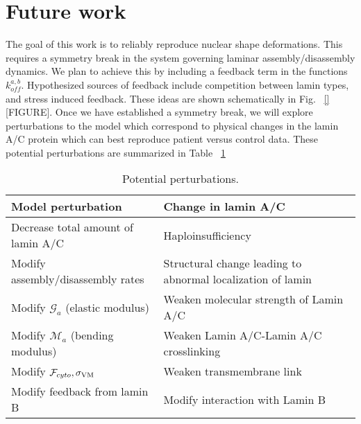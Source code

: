 \section{Future work} \label{sec:futurework}

The goal of this work is to reliably reproduce nuclear shape deformations. This requires a symmetry break in the system governing laminar assembly/disassembly dynamics. We plan to achieve this by including a feedback term in the functions $k_{off}^{a,b}$. Hypothesized sources of feedback include competition between lamin types, and stress induced feedback. These ideas are shown schematically in Fig. ~\ref{} [FIGURE]. Once we have established a symmetry break, we will explore perturbations to the model which correspond to physical changes  in the lamin A/C protein which can best reproduce patient versus control data. These potential perturbations are summarized in Table ~\ref{tab:perturbations}

\begin{table}[t!]
\caption{Potential perturbations.}\centering \label{tab:perturbations} 
\begin{tabular}{ l  l}
\hline
Model perturbation & Change in lamin A/C \\
\hline
Decrease total amount of lamin A/C  & Haploinsufficiency  \\
Modify assembly/disassembly rates & Structural change leading to abnormal localization of lamin\\
Modify $\mathcal{G}_a$ (elastic modulus) & Weaken molecular strength of Lamin A/C  \\
Modify $\mathcal{M}_a$ (bending modulus)& Weaken Lamin A/C-Lamin A/C crosslinking  \\
Modify $\mathcal{F}_{cyto}, \sigma_{\rm VM}$ & Weaken transmembrane link  \\
Modify feedback from lamin B &Modify interaction with Lamin B \\
\hline
\end{tabular}
\end{table}